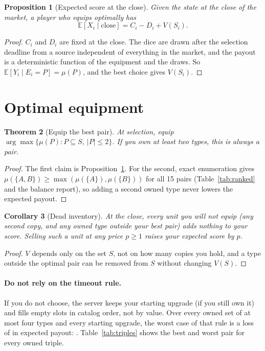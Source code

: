\documentclass[11pt]{article}
\newtheorem{theorem}{Theorem}
\newtheorem{proposition}[theorem]{Proposition}
\newtheorem{corollary}[theorem]{Corollary}
\theoremstyle{definition}
\newcommand{\E}{\mathbb{E}}
\begin{document}
\begin{proposition}[Expected score at the close]\label{prop:value}
Given the state at the close of the market, a player who equips optimally has
\[
  \E[X_i \mid \text{close}] = C_i - D_i + V(S_i).
\]
\end{proposition}
\begin{proof}
$C_i$ and $D_i$ are fixed at the close. The dice are drawn after the selection deadline from a source independent of everything in the market, and the payout is a deterministic function of the equipment and the draws. So $\E[Y_i \mid E_i = P] = \mu(P)$, and the best choice gives $V(S_i)$.
\end{proof}

\section{Optimal equipment}

\begin{theorem}[Equip the best pair]\label{thm:equip}
At selection, equip $\arg\max\{\mu(P): P \subseteq S,\ |P|\le 2\}$. If you own at least two types, this is always a pair.
\end{theorem}
\begin{proof}
The first claim is Proposition~\ref{prop:value}. For the second, exact enumeration gives $\mu(\{A,B\}) \ge \max(\mu(\{A\}), \mu(\{B\}))$ for all 15 pairs (Table~\ref{tab:ranked} and the balance report), so adding a second owned type never lowers the expected payout.
\end{proof}

\begin{corollary}[Dead inventory]\label{cor:dead}
At the close, every unit you will not equip (any second copy, and any owned type outside your best pair) adds nothing to your score. Selling such a unit at any price $p \ge 1$ raises your expected score by $p$.
\end{corollary}
\begin{proof}
$V$ depends only on the set $S$, not on how many copies you hold, and a type outside the optimal pair can be removed from $S$ without changing $V(S)$.
\end{proof}

\paragraph{Do not rely on the timeout rule.} If you do not choose, the server keeps your starting upgrade (if you still own it) and fills empty slots in catalog order, not by value. Over every owned set of at most four types and every starting upgrade, the worst case of that rule is a loss of \MaxFallbackLoss{} in expected payout: \MaxFallbackWhere. Table~\ref{tab:triples} shows the best and worst pair for every owned triple.
\end{document}
